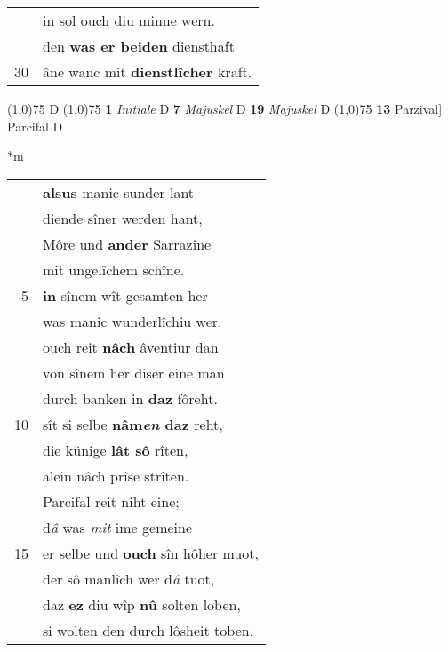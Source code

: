 \documentclass[8pt,a4paper,notitlepage]{article}
\begin{document}
\begin{table}[ht]
\begin{minipage}[t]{0.5\linewidth}
\begin{tabular}{rl}
 & in sol ouch diu minne wern.\\ 
 & den \textbf{was er beiden} diensthaft\\ 
30 & âne wanc mit \textbf{dienstlîcher} kraft.\\ 
\end{tabular}
\scriptsize
\line(1,0){75} \newline
D \newline
\line(1,0){75} \newline
\textbf{1} \textit{Initiale} D  \textbf{7} \textit{Majuskel} D  \textbf{19} \textit{Majuskel} D  \newline
\line(1,0){75} \newline
\textbf{13} Parzival] Parcifal D \newline
\end{minipage}
\hspace{0.5cm}
\begin{minipage}[t]{0.5\linewidth}
\small
\begin{center}*m
\end{center}
\begin{tabular}{rl}
 & \textbf{alsus} manic sunder lant\\ 
 & diende sîner werden hant,\\ 
 & Môre und \textbf{ander} Sarrazine\\ 
 & mit ungelîchem schîne.\\ 
5 & \textbf{in} sînem wît gesamten her\\ 
 & was manic wunderlîchiu wer.\\ 
 & ouch reit \textbf{nâch} âventiur dan\\ 
 & von sînem her diser eine man\\ 
 & durch banken in \textbf{daz} fôreht.\\ 
10 & sît si selbe \textbf{nâm\textit{en} daz} reht,\\ 
 & die künige \textbf{lât sô} rîten,\\ 
 & alein nâch prîse strîten.\\ 
 & Parcifal reit niht eine;\\ 
 & d\textit{â} was \textit{mit} ime gemeine\\ 
15 & er selbe und \textbf{ouch} sîn hôher muot,\\ 
 & der sô manlîch wer d\textit{â} tuot,\\ 
 & daz \textbf{ez} diu wîp \textbf{nû} solten loben,\\ 
 & si wolten den durch lôsheit toben.\\ 

\end{tabular}
\end{minipage}
\end{table}
\end{document}
